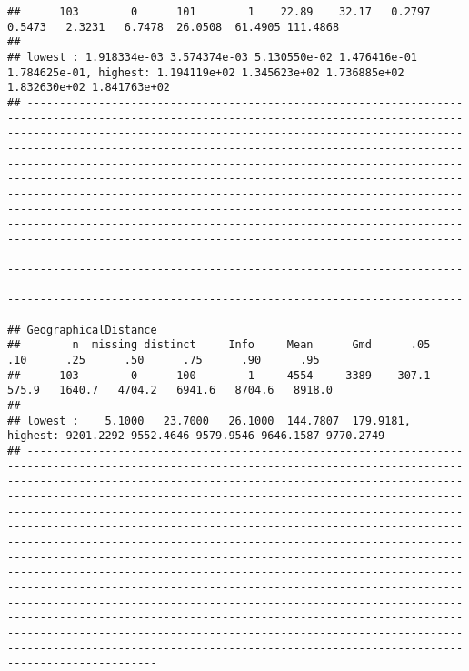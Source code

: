 \documentclass[]{article}
\begin{document}
\begin{verbatim}
##      103        0      101        1    22.89    32.17   0.2797   0.5473   2.3231   6.7478  26.0508  61.4905 111.4868 
## 
## lowest : 1.918334e-03 3.574374e-03 5.130550e-02 1.476416e-01 1.784625e-01, highest: 1.194119e+02 1.345623e+02 1.736885e+02 1.832630e+02 1.841763e+02
## ----------------------------------------------------------------------------------------------------------------------------------------------------------------------------------------------------------------------------------------------------------------------------------------------------------------------------------------------------------------------------------------------------------------------------------------------------------------------------------------------------------------------------------------------------------------------------------------------------------------------------------------------------------------------------------------------------------------------------------------------------------------------------------------------------------------------------------------------------------------------------------------------------------------------------------------------------------------------------------------------------------------------------------------
## GeographicalDistance 
##        n  missing distinct     Info     Mean      Gmd      .05      .10      .25      .50      .75      .90      .95 
##      103        0      100        1     4554     3389    307.1    575.9   1640.7   4704.2   6941.6   8704.6   8918.0 
## 
## lowest :    5.1000   23.7000   26.1000  144.7807  179.9181, highest: 9201.2292 9552.4646 9579.9546 9646.1587 9770.2749
## ----------------------------------------------------------------------------------------------------------------------------------------------------------------------------------------------------------------------------------------------------------------------------------------------------------------------------------------------------------------------------------------------------------------------------------------------------------------------------------------------------------------------------------------------------------------------------------------------------------------------------------------------------------------------------------------------------------------------------------------------------------------------------------------------------------------------------------------------------------------------------------------------------------------------------------------------------------------------------------------------------------------------------------------

\end{verbatim}
\end{document}
